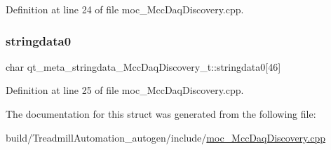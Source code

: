 Definition at line 24 of file moc\+\_\+\+Mcc\+Daq\+Discovery.\+cpp.

\mbox{\label{structqt__meta__stringdata___mcc_daq_discovery__t_a93091d55f2177b08e3bc08c60fc1c3ff}} 
\subsubsection{\texorpdfstring{stringdata0}{stringdata0}}
{\footnotesize\ttfamily char qt\+\_\+meta\+\_\+stringdata\+\_\+\+Mcc\+Daq\+Discovery\+\_\+t\+::stringdata0\mbox{[}46\mbox{]}}



Definition at line 25 of file moc\+\_\+\+Mcc\+Daq\+Discovery.\+cpp.



The documentation for this struct was generated from the following file\+:\begin{DoxyCompactItemize}
\item 
build/\+Treadmill\+Automation\+\_\+autogen/include/\hyperlink{moc___mcc_daq_discovery_8cpp}{moc\+\_\+\+Mcc\+Daq\+Discovery.\+cpp}\end{DoxyCompactItemize}

